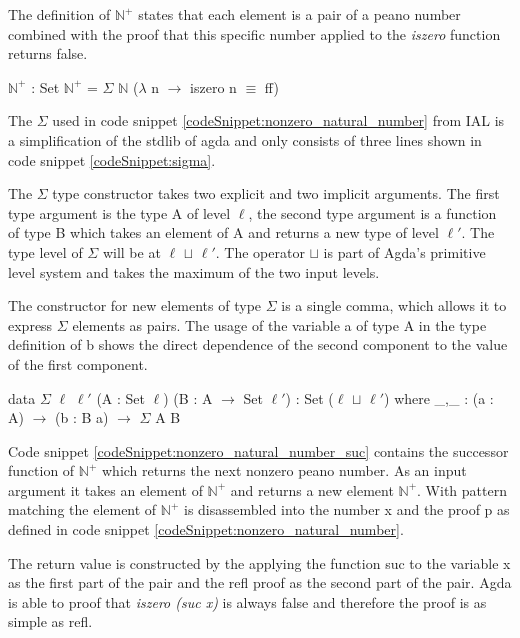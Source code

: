 The definition of $\mathbb{N}^+$ states that each element is a pair of a peano number combined with the proof that this specific number applied to the \emph{iszero} function returns false.

\begin{codesnippet}[mathescape=true, caption={Definition of nonzero peano numbers in Agda}, label={codeSnippet:nonzero_natural_number}]
$\mathbb{N}^+$ : Set
$\mathbb{N}^+$ = $\Sigma$ $\mathbb{N}$ ($\lambda$ n $\rightarrow$ iszero n $\equiv$ ff)
\end{codesnippet}

The $\Sigma$ used in code snippet \ref{codeSnippet:nonzero_natural_number} from IAL is a simplification of the stdlib of agda and only consists of three lines shown in code snippet \ref{codeSnippet:sigma}.

The $\Sigma$ type constructor takes two explicit and two implicit arguments. 
The first type argument is the type A of level $\ell$, the second type argument is a function of type B which takes an element of A and returns a new type of level $\ell '$.
The type level of $\Sigma$ will be at $\ell$ $\sqcup$ $\ell '$. The operator $\sqcup$ is part of Agda's primitive level system and takes the maximum of the two input levels.

The constructor for new elements of type $\Sigma$ is a single comma, which allows it to express $\Sigma$ elements as pairs.
The  usage of the variable a of type A in the type definition of b shows the direct dependence of the second component to the value of the first component.

\begin{codesnippet}[mathescape=true, caption={Definition of $\Sigma$ in Agda}, label={codeSnippet:sigma}]
data $\Sigma$ {$\ell$ $\ell '$} (A : Set $\ell$) (B : A $\rightarrow$ Set $\ell '$)
 : Set ($\ell$ $\sqcup$ $\ell '$) where
_,_ : (a : A) $\rightarrow$ (b : B a) $\rightarrow$ $\Sigma$ A B
\end{codesnippet}

Code snippet \ref{codeSnippet:nonzero_natural_number_suc} contains the successor function of $\mathbb{N}^+$ which returns the next nonzero peano number.
As an input argument it takes an element of $\mathbb{N}^+$ and returns a new element $\mathbb{N}^+$. 
With pattern matching the element of $\mathbb{N}^+$ is disassembled into the number x and the proof p as defined in code snippet \ref{codeSnippet:nonzero_natural_number}.

The return value is constructed by the applying the function suc to the variable x as the first part of the pair and the refl proof as the second part of the pair.
Agda is able to proof that \emph{iszero (suc x)} is always false and therefore the proof is as simple as refl.

